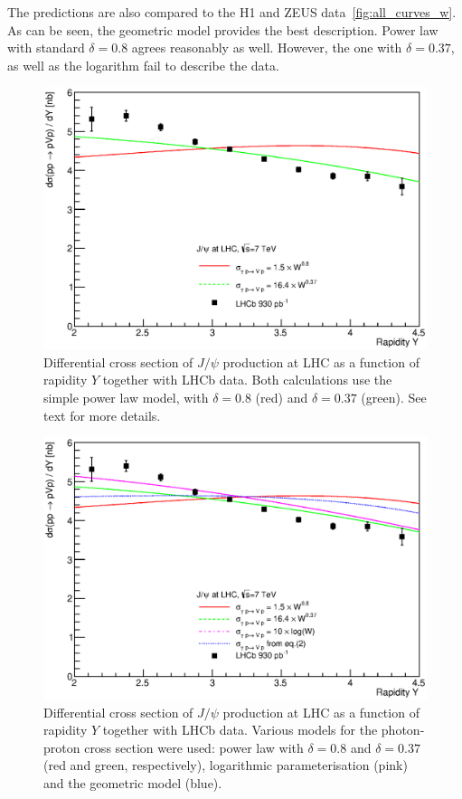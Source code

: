\documentclass[12pt]{article}
\begin{document}
The predictions are also compared to the H1 and ZEUS data~\ref{fig:all_curves_w}.
As can be seen, the geometric model provides the best description.
Power law with standard $\delta=0.8$ agrees reasonably as well.
However, the one with $\delta=0.37$, as well as the logarithm fail to describe the data.

\begin{figure}[!h]
\centering
 \includegraphics[width=.8\textwidth]{figures/dSigma_dy_comparison2.eps}
 \caption{Differential cross section of $J/\psi$ production at LHC as a function of rapidity $Y$ together with LHCb data.
          Both calculations use the simple power law model, with $\delta=0.8$ (red) and $\delta=0.37$ (green).
          See text for more details.}
 \label{fig:delta_fit}
\end{figure}

\begin{figure}[!h]
\centering
 \includegraphics[width=.8\textwidth]{figures/dSigma_dy_comparison3.eps}
 \caption{Differential cross section of $J/\psi$ production at LHC as a function of rapidity $Y$ together with LHCb data.
          Various models for the photon-proton cross section were used: power law with $\delta=0.8$ and $\delta=0.37$ (red and green, respectively),
          logarithmic parameterisation (pink) and the geometric model (blue).
          }
  \label{fig:all_curves}
\end{figure}
\end{document}
